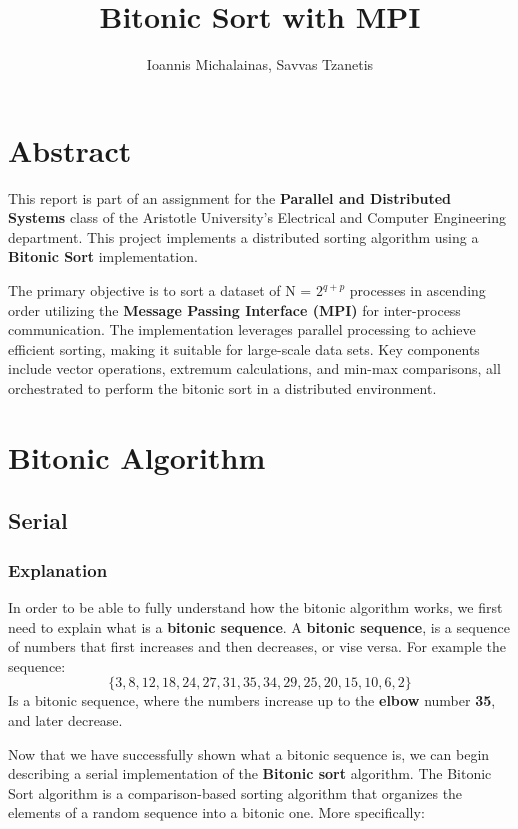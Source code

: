 \documentclass[12pt]{report}
\begin{document}
\title{\textbf{Bitonic Sort with MPI}}
\author{Ioannis Michalainas, Savvas Tzanetis}
\maketitle

\tableofcontents  %

\chapter{Abstract}
This report is part of an assignment for the \textbf{Parallel and Distributed Systems} class of the
Aristotle University's Electrical and Computer Engineering department. This project implements a
distributed sorting algorithm using a \textbf{Bitonic Sort} implementation. 

The primary objective is to sort a dataset of N = $2^{q+p}$ processes in ascending \newline order
utilizing the \textbf{Message Passing Interface (MPI)} for inter-process communication. The
implementation leverages parallel processing to achieve efficient sorting, making it suitable for
large-scale data sets. Key components include vector operations, extremum calculations, and min-max
comparisons, all orchestrated to perform the bitonic sort in a distributed environment.

\chapter{Bitonic Algorithm}
    \section{Serial}
        \subsection{Explanation}
        In order to be able to fully understand how the bitonic algorithm works, we first need to explain what is a \textbf{bitonic sequence}. A \textbf{bitonic sequence}, is a sequence of numbers that first increases and then decreases, or vise versa. For example the sequence:
        \[
            \{3, 8, 12, 18, 24, 27, 31, 35, 34, 29, 25, 20, 15, 10, 6, 2\}
        \]
        Is a bitonic sequence, where the numbers increase up to the \textbf{elbow} number
        \textbf{35}, and later decrease.        
        
        Now that we have successfully shown what a bitonic sequence is, we can begin describing a 
        serial implementation of the \textbf{Bitonic sort} algorithm. The Bitonic Sort algorithm is a 
        comparison-based sorting algorithm that organizes the elements of a random sequence into a
        bitonic one. More specifically:
\end{document}

